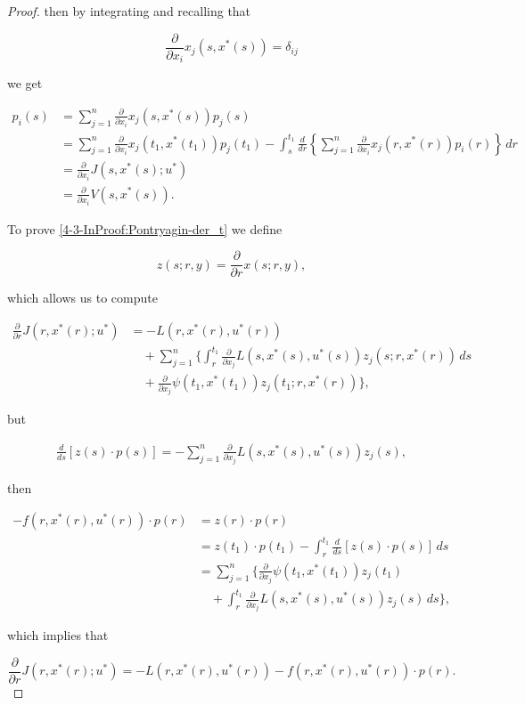 \begin{theorem}
\begin{proof}
        then by integrating and recalling that 
        
        \[\frac{\partial}{\partial x_i}x_j(s,x^{\ast}(s))=\delta_{ij}\]
        
        we get 

        \begin{align*}
            p_i(s) &= \sum_{j=1}^n \frac{\partial}{\partial x_i}x_j(s,x^{\ast}(s))p_j(s) \\
            & = \sum_{j=1}^n \frac{\partial}{\partial x_i}x_j(t_1,x^{\ast}(t_1))p_j(t_1) - \int_s^{t_1} \frac{d}{dr}\left\{\sum_{j=1}^n \frac{\partial}{\partial x_i}x_j(r,x^{\ast}(r))p_i(r) \right\}\,dr \\
            &= \frac{\partial}{\partial x_i}J(s,x^{\ast}(s);u^{\ast}) \\
            & = \frac{\partial}{\partial x_i}V(s,x^{\ast}(s)).
        \end{align*}

        To prove \ref{4-3-InProof:Pontryagin-der_t} we define

        \[z(s;r,y) = \frac{\partial}{\partial r}x(s;r,y),\]

        which allows us to compute 

        \begin{align*}
            \frac{\partial}{\partial r}J(r,x^{\ast}(r);u^{\ast}) & = -L(r,x^{\ast}(r), u^{\ast}(r)) \\
            & \quad + \sum_{j=1}^n\Bigg\{\int_r^{t_1}\frac{\partial}{\partial x_j}L(s,x^{\ast}(s),u^{\ast}(s))z_j(s;r,x^{\ast}(r))\,ds \\
            & \quad + \frac{\partial}{\partial x_j}\psi(t_1,x^{\ast}(t_1))z_j(t_1;r,x^{\ast}(r))\Bigg\},
        \end{align*}

        but 
        
        \begin{align*}
            \frac{d}{ds}\left[z(s)\cdot p(s)\right] = - \sum_{j=1}^n \frac{\partial}{\partial x_j} L(s,x^{\ast}(s),u^{\ast}(s))z_j(s),
        \end{align*}

        then

        \begin{align*}
            -f(r,x^{\ast}(r),u^{\ast}(r))\cdot p(r) & = z(r)\cdot p(r)\\
            & = z(t_1)\cdot p(t_1) - \int_r^{t_1} \frac{d}{ds}[z(s)\cdot p(s)]\,ds \\
            & = \sum_{j=1}^n\Bigg\{\frac{\partial}{\partial x_j}\psi(t_1,x^{\ast}(t_1))z_j(t_1) \\
            & \quad + \int_r^{t_1} \frac{\partial}{\partial x_j}L(s,x^{\ast}(s),u^{\ast}(s))z_j(s)\,ds\Bigg\},
        \end{align*}

        which implies that

        \[\frac{\partial}{\partial r}J(r,x^{\ast}(r);u^{\ast}) = - L(r,x^{\ast}(r),u^{\ast}(r)) - f(r,x^{\ast}(r),u^{\ast}(r))\cdot p(r).\]
    \end{proof}
\end{theorem}